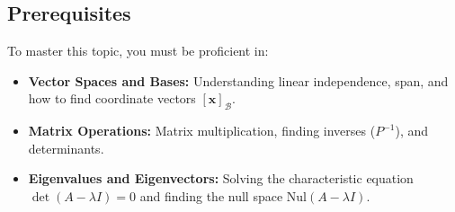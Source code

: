 \documentclass[11pt, a4paper]{article}
\theoremstyle{definition}
\theoremstyle{remark}
\begin{document}
\subsection{Prerequisites}
To master this topic, you must be proficient in:
\begin{itemize}
    \item \textbf{Vector Spaces and Bases:} Understanding linear independence, span, and how to find coordinate vectors $[\mathbf{x}]_\mathcal{B}$.
    \item \textbf{Matrix Operations:} Matrix multiplication, finding inverses ($P^{-1}$), and determinants.
    \item \textbf{Eigenvalues and Eigenvectors:} Solving the characteristic equation $\det(A - \lambda I) = 0$ and finding the null space $\text{Nul}(A - \lambda I)$.
\end{itemize}
\end{document}
